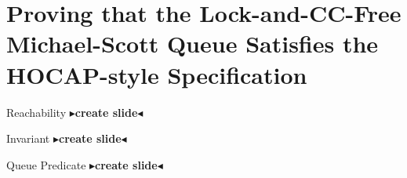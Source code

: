 \documentclass[9pt]{beamer}
\newcommand{\todo}[1]{{\color[rgb]{.5,0,0}\textbf{$\blacktriangleright$#1$\blacktriangleleft$}}}
\begin{document}

\section{Proving that the Lock-and-CC-Free Michael-Scott Queue Satisfies the HOCAP-style Specification}

\begin{frame}{Reachability}
  \todo{create slide}
\end{frame}

\begin{frame}{Invariant}
  \todo{create slide}
\end{frame}

\begin{frame}{Queue Predicate}
  \todo{create slide}
\end{frame}
\end{document}
